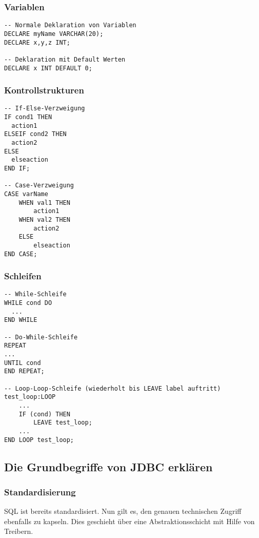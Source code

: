 \subsubsection{Variablen}
\begin{lstlisting}[caption={Variabeln},label=lst:vars]
-- Normale Deklaration von Variablen
DECLARE myName VARCHAR(20); 
DECLARE x,y,z INT;

-- Deklaration mit Default Werten
DECLARE x INT DEFAULT 0;
\end{lstlisting}

\subsubsection{Kontrollstrukturen}
\begin{lstlisting}[caption={Verzweigung},label=lst:if]
-- If-Else-Verzweigung
IF cond1 THEN
  action1
ELSEIF cond2 THEN
  action2
ELSE
  elseaction
END IF;

-- Case-Verzweigung
CASE varName
	WHEN val1 THEN 
		action1
	WHEN val2 THEN 
		action2
	ELSE 
		elseaction
END CASE;
\end{lstlisting}

\subsubsection{Schleifen}

\begin{lstlisting}[caption={Schleifen},label=lst:loops_while]
-- While-Schleife
WHILE cond DO
  ...
END WHILE

-- Do-While-Schleife
REPEAT
...
UNTIL cond
END REPEAT;

-- Loop-Loop-Schleife (wiederholt bis LEAVE label auftritt)
test_loop:LOOP
	...
	IF (cond) THEN
		LEAVE test_loop;
	...
END LOOP test_loop;
\end{lstlisting}

\subsection{Die Grundbegriffe von JDBC erklären}

\subsubsection{Standardisierung}

SQL ist bereits standardisiert. Nun gilt es, den genauen technischen Zugriff ebenfalls zu kapseln. Dies geschieht über eine Abstraktionsschicht mit Hilfe von Treibern.

